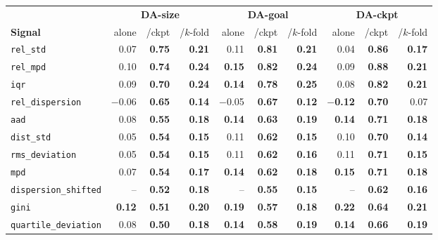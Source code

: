 \begin{table}[t]
\centering
\scriptsize
\begin{adjustbox}{max width=\textwidth}
\begin{tabular}{@{}lrrrrrrrrr@{}}
\toprule
 & \multicolumn{3}{c}{\textbf{DA-size}} & \multicolumn{3}{c}{\textbf{DA-goal}} & \multicolumn{3}{c}{\textbf{DA-ckpt}} \\
\cmidrule(lr){2-4}\cmidrule(lr){5-7}\cmidrule(lr){8-10}
\textbf{Signal} & alone & /ckpt & /$k$-fold & alone & /ckpt & /$k$-fold & alone & /ckpt & /$k$-fold \\
\midrule
\texttt{rel\_std} & 0.07 & \textbf{0.75} & \textbf{0.21} & 0.11 & \textbf{0.81} & \textbf{0.21} & 0.04 & \textbf{0.86} & \textbf{0.17} \\
\texttt{rel\_mpd} & 0.10 & \textbf{0.74} & \textbf{0.24} & \textbf{0.15} & \textbf{0.82} & \textbf{0.24} & 0.09 & \textbf{0.88} & \textbf{0.21} \\
\texttt{iqr} & 0.09 & \textbf{0.70} & \textbf{0.24} & \textbf{0.14} & \textbf{0.78} & \textbf{0.25} & 0.08 & \textbf{0.82} & \textbf{0.21} \\
\texttt{rel\_dispersion} & $-$0.06 & \textbf{0.65} & \textbf{0.14} & $-$0.05 & \textbf{0.67} & \textbf{0.12} & \textbf{$-$0.12} & \textbf{0.70} & 0.07 \\
\texttt{aad} & 0.08 & \textbf{0.55} & \textbf{0.18} & \textbf{0.14} & \textbf{0.63} & \textbf{0.19} & \textbf{0.14} & \textbf{0.71} & \textbf{0.18} \\
\texttt{dist\_std} & 0.05 & \textbf{0.54} & \textbf{0.15} & 0.11 & \textbf{0.62} & \textbf{0.15} & 0.10 & \textbf{0.70} & \textbf{0.14} \\
\texttt{rms\_deviation} & 0.05 & \textbf{0.54} & \textbf{0.15} & 0.11 & \textbf{0.62} & \textbf{0.16} & 0.11 & \textbf{0.71} & \textbf{0.15} \\
\texttt{mpd} & 0.07 & \textbf{0.54} & \textbf{0.17} & \textbf{0.14} & \textbf{0.62} & \textbf{0.18} & \textbf{0.15} & \textbf{0.71} & \textbf{0.18} \\
\texttt{dispersion\_shifted} & -- & \textbf{0.52} & \textbf{0.18} & -- & \textbf{0.55} & \textbf{0.15} & -- & \textbf{0.62} & \textbf{0.16} \\
\texttt{gini} & \textbf{0.12} & \textbf{0.51} & \textbf{0.20} & \textbf{0.19} & \textbf{0.57} & \textbf{0.18} & \textbf{0.22} & \textbf{0.64} & \textbf{0.21} \\
\texttt{quartile\_deviation} & 0.08 & \textbf{0.50} & \textbf{0.18} & \textbf{0.14} & \textbf{0.58} & \textbf{0.19} & \textbf{0.14} & \textbf{0.66} & \textbf{0.19} \\

\end{tabular}
\end{adjustbox}
\end{table}
